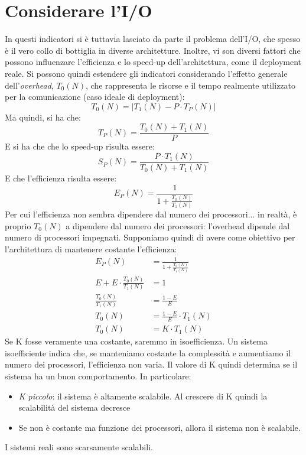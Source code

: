 \section{Considerare l'I/O}
In questi indicatori si è tuttavia lasciato da parte il problema dell'I/O, che spesso è il vero collo di bottiglia in
diverse architetture. Inoltre, vi son diversi fattori che possono influenzare l'efficienza e lo speed-up
dell'architettura, come il deployment reale. Si possono quindi estendere gli indicatori considerando l'effetto
generale dell'\textit{overhead}, $T_0(N)$, che rappresenta le risorse e il tempo
realmente utilizzato per la comunicazione
(caso ideale di deployment):
\begin{equation}
T_0(N) = \left|T_1(N) - P \cdot T_P(N)\right|
\end{equation}
Ma quindi, si ha che:
\begin{equation}
 T_P(N) = \frac{T_0(N) + T_1(N)}{P}
\end{equation}
E si ha che che lo speed-up risulta essere:
\begin{equation}
 S_P(N) = \frac{P \cdot T_1(N)}{T_0(N) + T_1(N)}
\end{equation}
E che l'efficienza risulta essere:
\begin{equation}
E_P(N) = \frac{1}{1 + \frac{T_0(N)}{T_1(N)}}
\end{equation}
Per cui l'efficienza non sembra dipendere dal numero dei processori... in realtà,
è proprio $T_0(N)$ a dipendere dal numero dei processori: l'overhead dipende dal numero di processori impegnati.
Supponiamo quindi di avere come obiettivo per l'architettura di mantenere costante l'efficienza:
\begin{align}
                            E_P(N) &= \frac{1}{1 + \frac{T_0(N)}{T_1(N)}} \nonumber \\
 E + E \cdot \frac{T_0(N)}{T_1(N)} &= 1                                   \nonumber \\
             \frac{T_0(N)}{T_1(N)} &= \frac{1 - E}{E}                     \nonumber \\
                            T_0(N) &= \frac{1 - E}{E} \cdot T_1(N)        \nonumber \\
                            T_0(N) &= K \cdot T_1(N)
\end{align}
Se K fosse veramente una costante, saremmo in isoefficienza. Un sistema isoefficiente indica che, se manteniamo
costante la complessità e aumentiamo il numero dei processori, l'efficienza non varia. Il valore di K quindi determina
se il sistema ha un buon comportamento. In particolare:
\begin{itemize}
 \item \textit{K piccolo}: il sistema è altamente scalabile. Al crescere di K quindi la scalabilità del sistema decresce
 \item Se non è costante ma funzione dei processori, allora il sistema non è scalabile.
\end{itemize}
I sistemi reali sono scarsamente scalabili.
